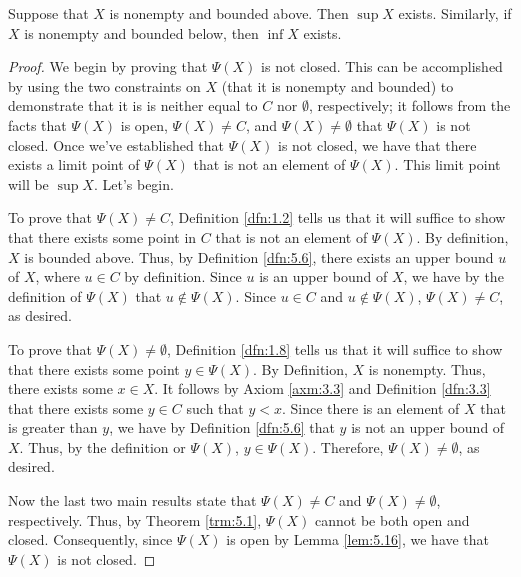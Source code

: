 \documentclass[../main.tex]{subfiles}
\begin{document}
\begin{theorem}\label{trm:5.17}
    Suppose that $X$ is nonempty and bounded above. Then $\sup X$ exists. Similarly, if $X$ is nonempty and bounded below, then $\inf X$ exists.
    \begin{proof}
        We begin by proving that $\Psi(X)$ is not closed. This can be accomplished by using the two constraints on $X$ (that it is nonempty and bounded) to demonstrate that it is is neither equal to $C$ nor $\emptyset$, respectively; it follows from the facts that $\Psi(X)$ is open, $\Psi(X)\neq C$, and $\Psi(X)\neq\emptyset$ that $\Psi(X)$ is not closed. Once we've established that $\Psi(X)$ is not closed, we have that there exists a limit point of $\Psi(X)$ that is not an element of $\Psi(X)$. This limit point will be $\sup X$. Let's begin.\par\smallskip
        To prove that $\Psi(X)\neq C$, Definition \ref{dfn:1.2} tells us that it will suffice to show that there exists some point in $C$ that is not an element of $\Psi(X)$. By definition, $X$ is bounded above. Thus, by Definition \ref{dfn:5.6}, there exists an upper bound $u$ of $X$, where $u\in C$ by definition. Since $u$ is an upper bound of $X$, we have by the definition of $\Psi(X)$ that $u\notin\Psi(X)$. Since $u\in C$ and $u\notin\Psi(X)$, $\Psi(X)\neq C$, as desired.\par
        To prove that $\Psi(X)\neq\emptyset$, Definition \ref{dfn:1.8} tells us that it will suffice to show that there exists some point $y\in\Psi(X)$. By Definition, $X$ is nonempty. Thus, there exists some $x\in X$. It follows by Axiom \ref{axm:3.3} and Definition \ref{dfn:3.3} that there exists some $y\in C$ such that $y<x$. Since there is an element of $X$ that is greater than $y$, we have by Definition \ref{dfn:5.6} that $y$ is not an upper bound of $X$. Thus, by the definition or $\Psi(X)$, $y\in\Psi(X)$. Therefore, $\Psi(X)\neq\emptyset$, as desired.\par
        Now the last two main results state that $\Psi(X)\neq C$ and $\Psi(X)\neq\emptyset$, respectively. Thus, by Theorem \ref{trm:5.1}, $\Psi(X)$ cannot be both open and closed. Consequently, since $\Psi(X)$ is open by Lemma \ref{lem:5.16}, we have that $\Psi(X)$ is not closed.\par

\end{proof}
\end{theorem}
\end{document}
